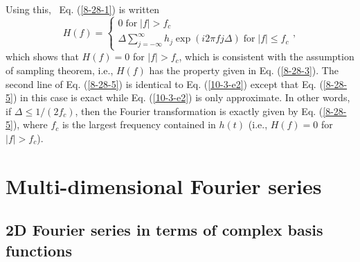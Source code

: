 \documentclass{article}
\newcommand{\tmop}[1]{\ensuremath{\operatorname{#1}}}
\begin{document}
Using this, \ Eq. (\ref{8-28-1}) is written
\begin{equation}
  \label{8-28-5} H (f) = \left\{ \begin{array}{l}
    0 \tmop{for} |f| > f_c\\
    \Delta \sum_{j = - \infty}^{\infty} h_j \exp (i 2 \pi f j \Delta)
    \tmop{for} |f| \leqslant f_c
  \end{array}, \right.
\end{equation}
which shows that $H (f) = 0$ for $|f| > f_c$, which is consistent with the
assumption of sampling theorem, i.e., $H (f)$ has the property given in Eq.
(\ref{8-28-3}). The second line of Eq. (\ref{8-28-5}) is identical to Eq.
(\ref{10-3-e2}) except that Eq. (\ref{8-28-5}) in this case is exact while Eq.
(\ref{10-3-e2}) is only approximate. In other words, if $\Delta \leqslant 1 /
(2 f_c)$, then the Fourier transformation is exactly given by Eq.
(\ref{8-28-5}), where $f_c$ is the largest frequency contained in $h (t)$
(i.e., $H (f) = 0$ for $|f| > f_c$).

\section{Multi-dimensional Fourier series}

\subsection{2D Fourier series in terms of complex basis functions}
\end{document}
